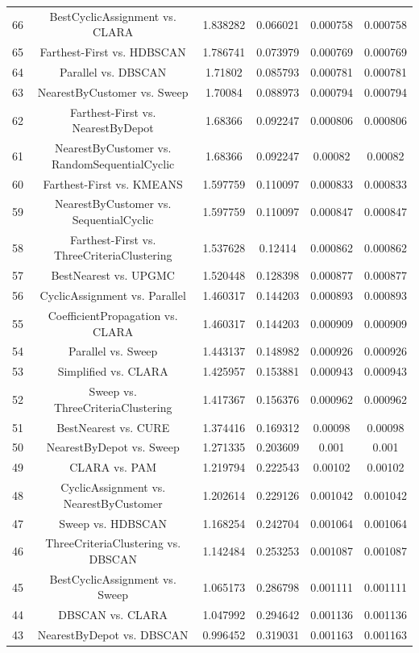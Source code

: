 \documentclass[a4paper,10pt]{article}
\begin{document}
\begin{landscape}
\begin{table}[!htp]
\begin{tabular}{cccccc}
66&BestCyclicAssignment vs. CLARA&1.838282&0.066021&0.000758&0.000758\\
65&Farthest-First vs. HDBSCAN&1.786741&0.073979&0.000769&0.000769\\
64&Parallel vs. DBSCAN&1.71802&0.085793&0.000781&0.000781\\
63&NearestByCustomer vs. Sweep&1.70084&0.088973&0.000794&0.000794\\
62&Farthest-First vs. NearestByDepot&1.68366&0.092247&0.000806&0.000806\\
61&NearestByCustomer vs. RandomSequentialCyclic&1.68366&0.092247&0.00082&0.00082\\
60&Farthest-First vs. KMEANS&1.597759&0.110097&0.000833&0.000833\\
59&NearestByCustomer vs. SequentialCyclic&1.597759&0.110097&0.000847&0.000847\\
58&Farthest-First vs. ThreeCriteriaClustering&1.537628&0.12414&0.000862&0.000862\\
57&BestNearest vs. UPGMC&1.520448&0.128398&0.000877&0.000877\\
56&CyclicAssignment vs. Parallel&1.460317&0.144203&0.000893&0.000893\\
55&CoefficientPropagation vs. CLARA&1.460317&0.144203&0.000909&0.000909\\
54&Parallel vs. Sweep&1.443137&0.148982&0.000926&0.000926\\
53&Simplified vs. CLARA&1.425957&0.153881&0.000943&0.000943\\
52&Sweep vs. ThreeCriteriaClustering&1.417367&0.156376&0.000962&0.000962\\
51&BestNearest vs. CURE&1.374416&0.169312&0.00098&0.00098\\
50&NearestByDepot vs. Sweep&1.271335&0.203609&0.001&0.001\\
49&CLARA vs. PAM&1.219794&0.222543&0.00102&0.00102\\
48&CyclicAssignment vs. NearestByCustomer&1.202614&0.229126&0.001042&0.001042\\
47&Sweep vs. HDBSCAN&1.168254&0.242704&0.001064&0.001064\\
46&ThreeCriteriaClustering vs. DBSCAN&1.142484&0.253253&0.001087&0.001087\\
45&BestCyclicAssignment vs. Sweep&1.065173&0.286798&0.001111&0.001111\\
44&DBSCAN vs. CLARA&1.047992&0.294642&0.001136&0.001136\\
43&NearestByDepot vs. DBSCAN&0.996452&0.319031&0.001163&0.001163\\

\end{tabular}
\end{table}
\end{landscape}
\end{document}
